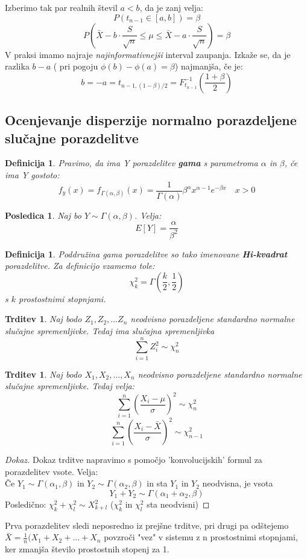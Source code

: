 \documentclass[11pt]{article}
\newtheorem{Trditev}[Izrek]{{\sc Trditev}}
\newtheorem{Posledica}[Izrek]{{\sc Posledica}}
\newtheorem{Definicija}[Izrek]{{\sc Definicija}}
\newenvironment{dokaz}[1][{\sc Dokaz}]{\begin{proof}[#1]\renewcommand*{\qedsymbol}{\(\blacksquare\)}}{\end{proof}}
\begin{document}
Izberimo tak par realnih števil $a<b$, da je zanj velja:
$$P(t_{n-1}\in [a,b]) = \beta$$
$$P(\bar{X}-b \cdot \frac{S}{\sqrt{n}} \le \mu \le \bar{X} -a \cdot \frac{S}{\sqrt{n}}) = \beta$$
V praksi imamo najraje \textit{najinformativnejši} interval zaupanja. Izkaže se, da je razlika $b-a$ ( pri pogoju $\phi(b) - \phi(a) = \beta$) najmanjša, če je:
$$b = -a = t_{n-1,(1-\beta)/2} = F^{-1}_{t_{n-1}}\left(\frac{1+\beta}{2}\right)$$
\subsection{Ocenjevanje disperzije normalno porazdeljene slučajne porazdelitve}

\begin{Definicija}
	Pravimo, da ima Y porazdelitev \textbf{gama} s parametroma $\alpha$ in $\beta$, če ima Y gostoto:
	$$f_y(x) = f_{\Gamma(\alpha,\beta)} (x) = \frac{1}{\Gamma(\alpha)}\beta^{\alpha}x^{\alpha - 1} e^{-\beta x} \quad x>0$$
\end{Definicija}
\begin{Posledica}
	Naj bo $Y\sim \Gamma(\alpha,\beta)$. Velja:
	$$E[Y] = \frac{\alpha}{\beta^2}$$
\end{Posledica}

\begin{Definicija}
	Poddružina gama porazdelitve so tako imenovane \textbf{Hi-kvadrat} porazdelitve. Za definicijo vzamemo tole:
	$$\chi_k^{2} = \Gamma(\frac{k}{2},\frac{1}{2})$$ s $k$ prostostnimi stopnjami.
\end{Definicija}
\begin{Trditev}
	Naj bodo $Z_1, Z_2,\ldots Z_n$ neodvisno porazdeljene standardno normalne slučajne spremenljivke. Tedaj ima slučajna spremenljivka 
	$$\sum_{i = 1}^{n}{Z_i^2} \sim \chi^2_n$$
\end{Trditev}
\begin{Trditev}
	Naj bodo $X_1, X_2, \ldots , X_n$ neodvisno porazdeljene standardno normalne slučajne spremenljivke. Tedaj velja:
	$$\sum_{i =1}^{n}\left(\frac{X_i- \mu}{\sigma}\right)^2\sim \chi^2_n$$
	$$\sum_{i =1}^{n}\left(\frac{X_i- \bar{X}}{\sigma}\right)^2\sim \chi^2_{n-1}$$
\end{Trditev}
\begin{dokaz}
	Dokaz trditve napravimo s pomočjo 'konvolucijskih' formul za porazdelitev vsote.
	Velja:
	\\
	Če $Y_1 \sim \Gamma(\alpha_1,\beta)$ in $Y_2 \sim \Gamma(\alpha_2,\beta)$ in sta $Y_1$ in $Y_2$ neodvisna, je vsota 
	$$Y_1 + Y_2 \sim \Gamma(\alpha_1+\alpha_2,\beta)$$
	Posledično: $\chi_k^2 + \chi_l^2 \sim X_{k+l}^2$ ($\chi_k^2$ in $\chi_l^2$ sta neodvisni)
\end{dokaz}
Prva porazdelitev sledi neposredno iz prejšne trditve, pri drugi pa odštejemo $\bar{X} = \frac{1}{n}{(X_1 + X_2 + \ldots + X_n}$ povzroči "vez" v sistemu z n prostostnimi stopnjami, ker zmanjša število prostostnih stopenj za 1.
\end{document}
